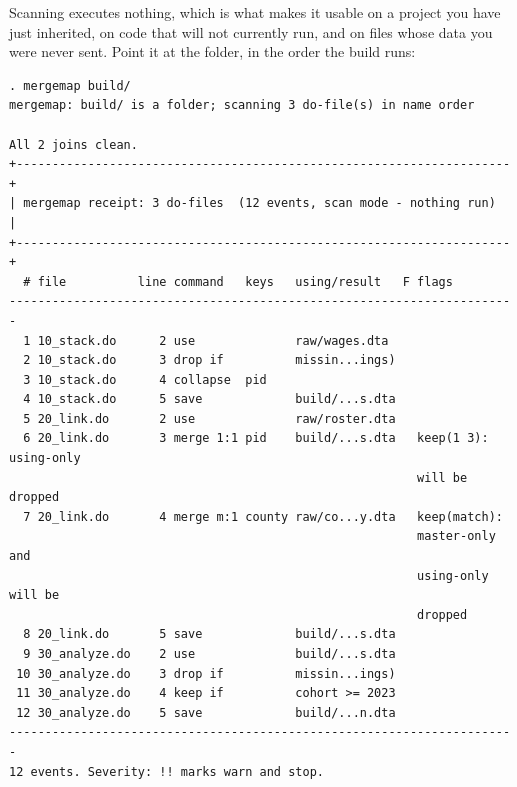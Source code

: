 \documentclass[
    a4paper,
    fontsize=10pt,
    twoside=true,
    numbers=noenddot,
]{kaobook}
\begin{document}
Scanning executes nothing, which is what makes it usable on a project you have just inherited, on code that will not currently run, and on files whose data you were never sent. Point it at the folder, in the order the build runs:
\par
{\footnotesize
\begin{verbatim}
. mergemap build/
mergemap: build/ is a folder; scanning 3 do-file(s) in name order

All 2 joins clean.
+---------------------------------------------------------------------+
| mergemap receipt: 3 do-files  (12 events, scan mode - nothing run)  |
+---------------------------------------------------------------------+
  # file          line command   keys   using/result   F flags
-----------------------------------------------------------------------
  1 10_stack.do      2 use              raw/wages.dta
  2 10_stack.do      3 drop if          missin...ings)
  3 10_stack.do      4 collapse  pid
  4 10_stack.do      5 save             build/...s.dta
  5 20_link.do       2 use              raw/roster.dta
  6 20_link.do       3 merge 1:1 pid    build/...s.dta   keep(1 3): using-only
                                                         will be dropped
  7 20_link.do       4 merge m:1 county raw/co...y.dta   keep(match):
                                                         master-only and
                                                         using-only will be
                                                         dropped
  8 20_link.do       5 save             build/...s.dta
  9 30_analyze.do    2 use              build/...s.dta
 10 30_analyze.do    3 drop if          missin...ings)
 11 30_analyze.do    4 keep if          cohort >= 2023
 12 30_analyze.do    5 save             build/...n.dta
-----------------------------------------------------------------------
12 events. Severity: !! marks warn and stop.
\end{verbatim}
}
\end{document}
